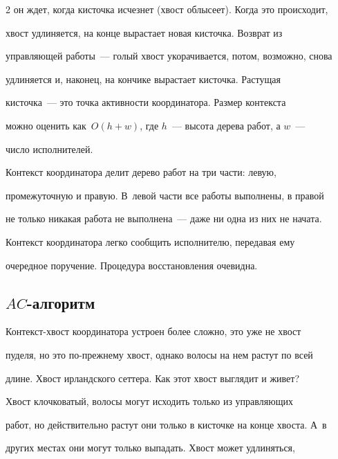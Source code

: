 \begin{multicols}{2}
он ждет, когда кис\-точ\-ка исчезнет (хвост облысеет). Когда это происходит, 


хвост удлиняется, на конце вырастает новая кис\-точ\-ка. Возврат из 


управляющей работы~--- голый хвост укорачивается, потом, возможно, снова 


удлиняется и, наконец, на кончике вырастает кисточка. Растущая 


      кисточка~--- это точка активности координатора. Размер контекста 


можно оценить как~$O(h+w)$, где $h$~--- высота дерева работ, а $w$~--- 


чис\-ло исполнителей.





      


      Контекст координатора делит дерево работ на три части: левую, 


промежуточную и правую. В~левой части все работы выполнены, в правой 


не только никакая работа не выполнена~--- даже ни одна из них не начата. 


      


      Контекст координатора легко сообщить исполнителю, передавая ему 


очередное поручение. Процедура восстановления очевидна. 





\subsection{$AC$-алгоритм}


      


      Контекст-хвост координатора устроен более сложно, это уже не хвост 


пуделя, но это по-преж\-не\-му хвост, однако волосы на нем растут по всей 


длине. Хвост ирландского сеттера. Как этот хвост выглядит и живет?


      


      Хвост клочковатый, волосы могут исходить только из управляющих 


работ, но действительно растут они только в кисточке на конце хвоста. А~в 


других местах они могут только выпадать. Хвост может удлиняться, 



\end{multicols}
